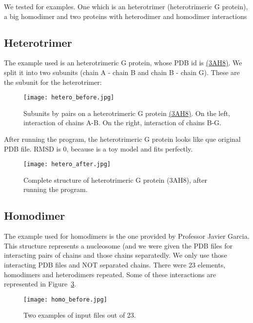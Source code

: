\documentclass[a4paper,10pt]{report}
\begin{document}
We tested for examples. One which is an heterotrimer (heterotrimeric G protein), a big homodimer and two proteins with heterodimer and homodimer interactions

\subsection{Heterotrimer}

The example used is an heterotrimeric G protein, whose PDB id is \href{https://www.rcsb.org/structure/3ah8}{(3AH8)}. We split it into two subunits (chain A - chain B and chain B - chain G). These are the subunit for the heterotrimer:

\begin{figure}[h]
\centering
\texttt{[image: hetero\_before.jpg]}
\caption{Subunits by pairs on a heterotrimeric G protein \href{https://www.rcsb.org/structure/3ah8}{(3AH8)}. On the left, interaction of chains A-B. On the right, interaction of chains B-G.}
\label{fig:1}
\end{figure}

\noindent
After running the program, the heterotrimeric G protein looks like que original PDB file. RMSD is 0, because is a toy model and fits perfectly.

\begin{figure}[h]
\centering
\texttt{[image: hetero\_after.jpg]}
\caption{Complete structure of heterotrimeric G protein (3AH8), after running the program.}
\label{fig:2}
\end{figure}

\newpage

\subsection{Homodimer}

The example used for homodimers is the one provided by Professor Javier Garcia. This structure represents a nucleosome (and we were given the PDB files for interacting pairs of chains and those chains separatedly. We only use those interacting PDB files and NOT separated chains. There were 23 elements, homodimers and heterodimers repeated. Some of these interactions are represented in Figure~\ref{fig:3}.\\

\begin{figure}[h]
\texttt{[image: homo\_before.jpg]}
\centering
\caption{Two examples of input files out of 23.}
\label{fig:3}
\end{figure}
\end{document}

